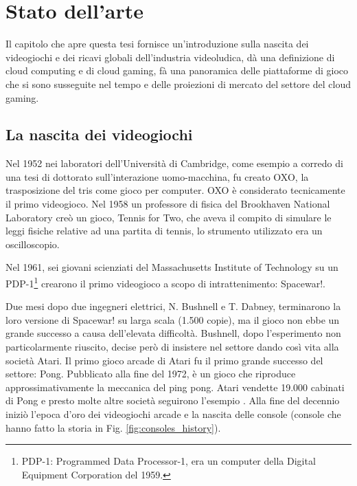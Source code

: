 %
%

\chapter{Stato dell'arte}
Il capitolo che apre questa tesi fornisce un'introduzione sulla nascita dei videogiochi e dei ricavi globali dell'industria videoludica, dà una definizione di cloud computing e di cloud gaming, fà una panoramica delle piattaforme di gioco che si sono susseguite nel tempo e delle proiezioni di mercato del settore del cloud gaming.




\section{La nascita dei videogiochi}
Nel 1952 nei laboratori dell'Università di Cambridge, come esempio a corredo di una tesi di dottorato sull'interazione uomo-macchina, fu creato OXO, la trasposizione del tris come gioco per computer. OXO è considerato tecnicamente il primo videogioco. Nel 1958 un professore di fisica del Brookhaven National Laboratory creò un gioco, Tennis for Two, che aveva il compito di simulare le leggi fisiche relative ad una partita di tennis, lo strumento utilizzato era un oscilloscopio.

Nel 1961, sei giovani scienziati del Massachusetts Institute of Technology su un PDP-1\footnote{PDP-1: Programmed Data Processor-1, era un computer della Digital Equipment Corporation del 1959.} crearono il primo videogioco a scopo di intrattenimento: Spacewar!.

Due mesi dopo due ingegneri elettrici, N. Bushnell e T. Dabney, terminarono la loro versione di Spacewar! su larga scala (1.500 copie), ma il gioco non ebbe un grande successo a causa dell'elevata difficoltà. Bushnell, dopo l'esperimento non particolarmente riuscito, decise però di insistere nel settore dando così vita alla società Atari. Il primo gioco arcade di Atari fu il primo grande successo del settore: Pong. Pubblicato alla fine del 1972, è un gioco che riproduce approssimativamente la meccanica del ping pong. Atari vendette 19.000 cabinati di Pong e presto molte altre società seguirono l'esempio \parencite{High_Score}. Alla fine del decennio iniziò l'epoca d'oro dei videogiochi arcade e la nascita delle console (console che hanno fatto la storia in Fig. \ref{fig:consoles_history}).


